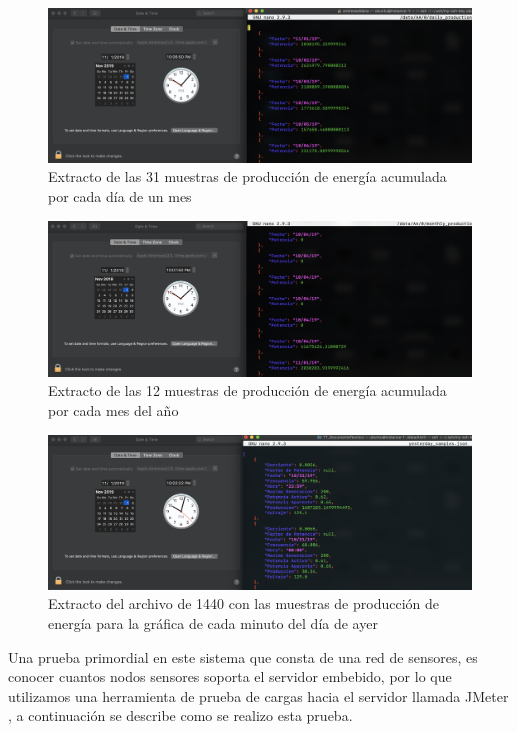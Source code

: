 \begin{figure}[H]
	\centering
	\includegraphics[scale=.3]{Capitulo5/images/daily.png}
	\caption{Extracto de las 31 muestras de producción de energía acumulada por cada día de un mes}
	\label{fig:}
\end{figure}

\begin{figure}[H]
	\centering
	\includegraphics[scale=.3]{Capitulo5/images/monthly.png}
	\caption{Extracto de las 12 muestras de producción de energía acumulada por cada mes del año}
	\label{fig:}
\end{figure} 


\begin{figure}[H]
	\centering
	\includegraphics[scale=.3]{Capitulo5/images/yesterday.png}
	\caption{Extracto del archivo de 1440 con las muestras de producción de energía para la gráfica de cada minuto del día de ayer}
	\label{fig:}
\end{figure} 

Una prueba primordial en este sistema que consta de una red de sensores, es conocer cuantos nodos sensores soporta el servidor embebido, por lo que utilizamos una herramienta de prueba de cargas hacia el servidor llamada JMeter \citep{JMeter}, a continuación se describe como se realizo esta prueba.

